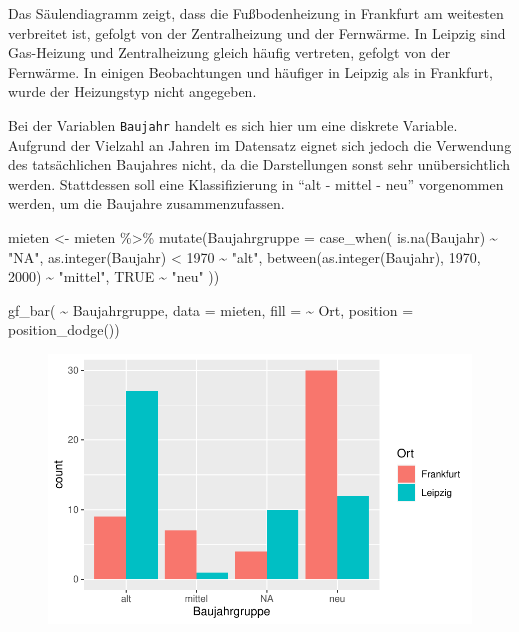 \documentclass[
  a4paper,
  DIV=11]{scrartcl}
\newenvironment{Shaded}{\begin{snugshade}}{\end{snugshade}}
\newcommand{\AttributeTok}[1]{\textcolor[rgb]{0.40,0.45,0.13}{#1}}
\newcommand{\ConstantTok}[1]{\textcolor[rgb]{0.56,0.35,0.01}{#1}}
\newcommand{\DecValTok}[1]{\textcolor[rgb]{0.68,0.00,0.00}{#1}}
\newcommand{\FunctionTok}[1]{\textcolor[rgb]{0.28,0.35,0.67}{#1}}
\newcommand{\NormalTok}[1]{\textcolor[rgb]{0.00,0.23,0.31}{#1}}
\newcommand{\OtherTok}[1]{\textcolor[rgb]{0.00,0.23,0.31}{#1}}
\newcommand{\SpecialCharTok}[1]{\textcolor[rgb]{0.37,0.37,0.37}{#1}}
\newcommand{\StringTok}[1]{\textcolor[rgb]{0.13,0.47,0.30}{#1}}
\begin{document}
Das Säulendiagramm zeigt, dass die Fußbodenheizung in Frankfurt am
weitesten verbreitet ist, gefolgt von der Zentralheizung und der
Fernwärme. In Leipzig sind Gas-Heizung und Zentralheizung gleich häufig
vertreten, gefolgt von der Fernwärme. In einigen Beobachtungen und
häufiger in Leipzig als in Frankfurt, wurde der Heizungstyp nicht
angegeben.

Bei der Variablen \texttt{Baujahr} handelt es sich hier um eine diskrete
Variable. Aufgrund der Vielzahl an Jahren im Datensatz eignet sich
jedoch die Verwendung des tatsächlichen Baujahres nicht, da die
Darstellungen sonst sehr unübersichtlich werden. Stattdessen soll eine
Klassifizierung in ``alt - mittel - neu'' vorgenommen werden, um die
Baujahre zusammenzufassen.

\begin{Shaded}
\begin{Highlighting}[]
\NormalTok{mieten }\OtherTok{\textless{}{-}}\NormalTok{ mieten }\SpecialCharTok{\%\textgreater{}\%}
  \FunctionTok{mutate}\NormalTok{(}\AttributeTok{Baujahrgruppe =} \FunctionTok{case\_when}\NormalTok{(}
    \FunctionTok{is.na}\NormalTok{(Baujahr) }\SpecialCharTok{\textasciitilde{}} \StringTok{"NA"}\NormalTok{,}
    \FunctionTok{as.integer}\NormalTok{(Baujahr) }\SpecialCharTok{\textless{}} \DecValTok{1970} \SpecialCharTok{\textasciitilde{}} \StringTok{"alt"}\NormalTok{,}
    \FunctionTok{between}\NormalTok{(}\FunctionTok{as.integer}\NormalTok{(Baujahr), }\DecValTok{1970}\NormalTok{, }\DecValTok{2000}\NormalTok{) }\SpecialCharTok{\textasciitilde{}} \StringTok{"mittel"}\NormalTok{,}
    \ConstantTok{TRUE} \SpecialCharTok{\textasciitilde{}} \StringTok{"neu"}
\NormalTok{  ))}

\FunctionTok{gf\_bar}\NormalTok{( }\SpecialCharTok{\textasciitilde{}}\NormalTok{ Baujahrgruppe, }\AttributeTok{data =}\NormalTok{ mieten, }\AttributeTok{fill =} \SpecialCharTok{\textasciitilde{}}\NormalTok{ Ort, }\AttributeTok{position =} \FunctionTok{position\_dodge}\NormalTok{())}
\end{Highlighting}
\end{Shaded}

\begin{figure}[H]

{\centering \includegraphics{Mietmodellierung_files/figure-pdf/unnamed-chunk-10-1.pdf}

}

\end{figure}
\end{document}
